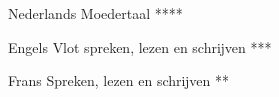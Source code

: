 




\begin{cvhonors}


\cvhonor
{Nederlands} %
{Moedertaal} %
{} %
{****} %


\cvhonor
{Engels} %
{Vlot spreken, lezen en schrĳven} %
{} %
{***} %






\cvhonor
{Frans} %
{Spreken, lezen en schrĳven} %
{} %
{**} %


\end{cvhonors}